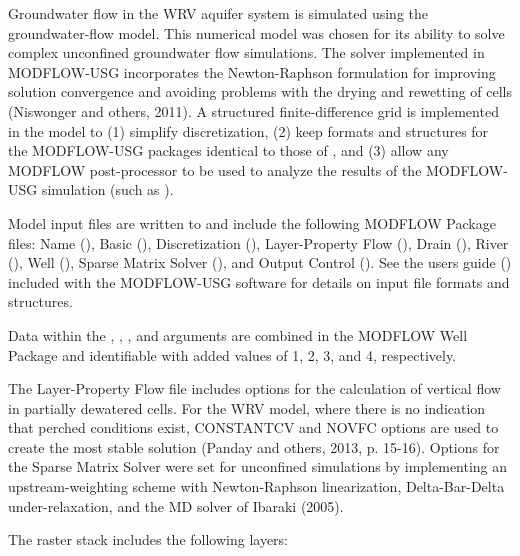 \documentclass[a4paper]{book}
\begin{document}
\begin{Details}\relax
Groundwater flow in the WRV aquifer system is simulated using the
 groundwater-flow model.
This numerical model was chosen for its ability to solve
complex unconfined groundwater flow simulations.
The solver implemented in MODFLOW-USG incorporates the Newton-Raphson formulation for
improving solution convergence and avoiding problems with the drying and
rewetting of cells (Niswonger and others, 2011).
A structured finite-difference grid is implemented in the model to
(1) simplify discretization,
(2) keep formats and structures for the MODFLOW-USG packages identical to those of
, and
(3) allow any MODFLOW post-processor to be used to analyze the results of the MODFLOW-USG simulation
(such as ).

Model input files are written to  and include the following MODFLOW Package files:
Name (), Basic (), Discretization (),
Layer-Property Flow (), Drain (), River (),
Well (), Sparse Matrix Solver (), and Output Control ().
See the users guide (\Cite{Description of Model Input and Output}) included with the MODFLOW-USG
software for details on input file formats and structures.

Data within the , , , and  arguments are
combined in the MODFLOW Well Package and identifiable with added  values of
1, 2, 3, and 4, respectively.

The Layer-Property Flow file includes options for the calculation of vertical flow in
partially dewatered cells.
For the WRV model, where there is no indication that perched conditions exist,
CONSTANTCV and NOVFC options are used to create the most stable solution
(Panday and others, 2013, p. 15-16).
Options for the Sparse Matrix Solver were set for unconfined simulations by
implementing an upstream-weighting scheme with Newton-Raphson linearization,
Delta-Bar-Delta under-relaxation, and the \eqn{\chi}{}MD solver of Ibaraki (2005).

The raster stack  includes the following layers:
\begin{description}


\end{description}
\end{Details}
\end{document}
